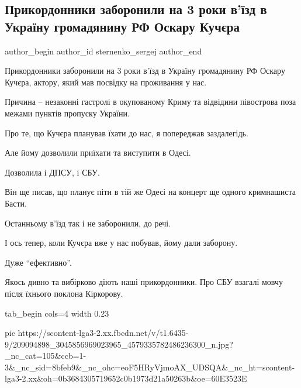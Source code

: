  
 
 
 
 
 
\subsection{Прикордонники заборонили на 3 роки в'їзд в Україну громадянину РФ Оскару Кучєра}
\label{sec:30_06_2021.fb.sternenko_sergej.1.pogranichniki_zapret}
\ifcmt
 author_begin
   author_id sternenko_sergej
 author_end
\fi

Прикордонники заборонили на 3 роки в'їзд в Україну громадянину РФ Оскару
Кучєра, актору, який мав посвідку на проживання у нас.

Причина – незаконні гастролі в окупованому Криму та відвідини півострова поза
межами пунктів пропуску України.

Про те, що Кучєра планував їхати до нас, я попереджав заздалегідь.

Але йому дозволили приїхати та виступити в Одесі.

Дозволила і ДПСУ, і СБУ.

Він ще писав, що планує піти в тій же Одесі на концерт ще одного кримнашиста
Басти.

Останньому в'їзд так і не заборонили, до речі.

І ось тепер, коли Кучєра вже у нас побував, йому дали заборону.

Дуже \enquote{ефективно}.

Якось дивно та вибірково діють наші прикордонники. Про СБУ взагалі мовчу після
їхнього поклона Кіркорову.


\ifcmt
  tab_begin cols=4
	width 0.23

     pic https://scontent-lga3-2.xx.fbcdn.net/v/t1.6435-9/209094898_3045856969023965_4579335782486236300_n.jpg?_nc_cat=105&ccb=1-3&_nc_sid=8bfeb9&_nc_ohc=eoF5HRyVjmoAX_UDSQA&_nc_ht=scontent-lga3-2.xx&oh=0b3684305719652c0b1973d21a50263b&oe=60E3523E

